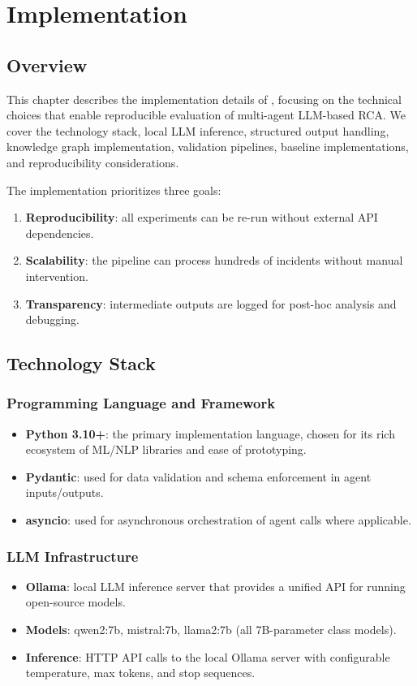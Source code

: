 
\chapter{Implementation}

\section{Overview}
This chapter describes the implementation details of \systemname{}, focusing on the technical
choices that enable reproducible evaluation of multi-agent LLM-based RCA. We cover the technology
stack, local LLM inference, structured output handling, knowledge graph implementation, validation
pipelines, baseline implementations, and reproducibility considerations.

The implementation prioritizes three goals:
\begin{enumerate}
  \item \textbf{Reproducibility}: all experiments can be re-run without external API dependencies.
  \item \textbf{Scalability}: the pipeline can process hundreds of incidents without manual
        intervention.
  \item \textbf{Transparency}: intermediate outputs are logged for post-hoc analysis and
        debugging.
\end{enumerate}

\section{Technology Stack}

\subsection{Programming Language and Framework}
\begin{itemize}
  \item \textbf{Python 3.10+}: the primary implementation language, chosen for its rich ecosystem
        of ML/NLP libraries and ease of prototyping.
  \item \textbf{Pydantic}: used for data validation and schema enforcement in agent
        inputs/outputs.
  \item \textbf{asyncio}: used for asynchronous orchestration of agent calls where applicable.
\end{itemize}

\subsection{LLM Infrastructure}
\begin{itemize}
  \item \textbf{Ollama}: local LLM inference server that provides a unified API for running
        open-source models.
  \item \textbf{Models}: qwen2:7b, mistral:7b, llama2:7b (all 7B-parameter class models).
  \item \textbf{Inference}: HTTP API calls to the local Ollama server with configurable
        temperature, max tokens, and stop sequences.
\end{itemize}

